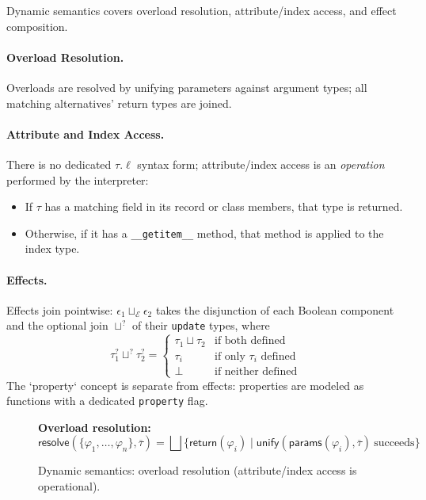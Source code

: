 Dynamic semantics covers overload resolution, attribute/index access, and effect composition.

\paragraph{Overload Resolution.}  
Overloads are resolved by unifying parameters against argument types; all matching alternatives’ return types are joined.

\paragraph{Attribute and Index Access.}  
There is no dedicated $\tau.\ell$ syntax form; attribute/index access is an \emph{operation} performed by the interpreter:  
\begin{itemize}
\item If $\tau$ has a matching field in its record or class members, that type is returned.
\item Otherwise, if it has a \texttt{\_\_getitem\_\_} method, that method is applied to the index type.
\end{itemize}

\paragraph{Effects.}  
Effects join pointwise: $\epsilon_1 \sqcup_{\mathcal{E}} \epsilon_2$ 
takes the disjunction of each Boolean component and the optional join $\sqcup^?$ of their \texttt{update} types, where
\[
\tau_1^? \sqcup^? \tau_2^? =
\begin{cases}
\tau_1 \sqcup \tau_2 & \text{if both defined} \\
\tau_i & \text{if only } \tau_i \text{ defined} \\
\bot & \text{if neither defined}
\end{cases}
\]
The `property` concept is separate from effects: properties are modeled as functions with a dedicated \texttt{property} flag.

\begin{figure*}[t]
\centering
\textbf{Overload resolution:}
\[
\mathsf{resolve}(\{\varphi_1, \ldots, \varphi_n\}, \overline{\tau}) =
\bigsqcup\{\mathsf{return}(\varphi_i) \mid \mathsf{unify}(\mathsf{params}(\varphi_i), \overline{\tau}) \ \text{succeeds}\}
\]
\caption{Dynamic semantics: overload resolution (attribute/index access is operational).}
\label{fig:dynamic}
\end{figure*}

